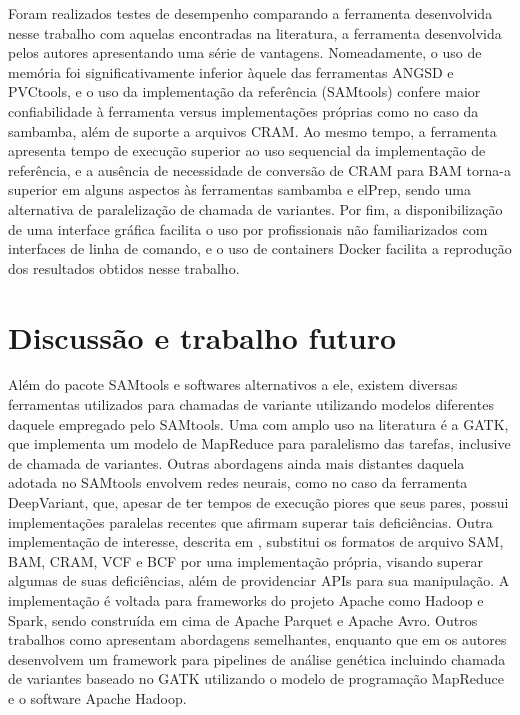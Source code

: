 \documentclass[cic,tc]{iiufrgs}
\begin{document}
Foram realizados testes de desempenho comparando a ferramenta desenvolvida
nesse trabalho com aquelas encontradas na literatura, a ferramenta desenvolvida
pelos autores apresentando uma série de vantagens. Nomeadamente, o uso de
memória foi significativamente inferior àquele das ferramentas ANGSD e
PVCtools, e o uso da implementação da referência (SAMtools) confere maior
confiabilidade à ferramenta versus implementações próprias como no caso da
sambamba, além de suporte a arquivos CRAM. Ao mesmo tempo, a ferramenta
apresenta tempo de execução superior ao uso sequencial da implementação de
referência, e a ausência de necessidade de conversão de CRAM para BAM torna-a
superior em alguns aspectos às ferramentas sambamba e elPrep, sendo uma
alternativa de paralelização de chamada de variantes. Por fim, a
disponibilização de uma interface gráfica facilita o uso por profissionais não
familiarizados com interfaces de linha de comando, e o uso de containers Docker
facilita a reprodução dos resultados obtidos nesse trabalho.

\section{Discussão e trabalho futuro}

Além do pacote SAMtools e softwares alternativos a ele, existem diversas
ferramentas utilizados para chamadas de variante utilizando modelos diferentes
daquele empregado pelo SAMtools. Uma com amplo uso na
literatura\cite{de2017gatk} é a GATK\cite{mckenna2010genome}, que implementa um
modelo de MapReduce para paralelismo das tarefas, inclusive de chamada de
variantes. Outras abordagens ainda mais distantes daquela adotada no SAMtools
envolvem redes neurais, como no caso da ferramenta
DeepVariant,\cite{poplin2018universal} que, apesar de ter tempos de execução
piores que seus pares, possui implementações paralelas recentes que afirmam
superar tais deficiências.\cite{ahmad2021vc} Outra implementação de interesse,
descrita em \cite{massie2013adam}, substitui os formatos de arquivo SAM, BAM,
CRAM, VCF e BCF por uma implementação própria, visando superar algumas de suas
deficiências, além de providenciar APIs para sua manipulação. A implementação é
voltada para frameworks do projeto Apache como Hadoop e Spark, sendo construída
em cima de Apache Parquet e Apache Avro.  Outros trabalhos como
\cite{boufea2017managing} apresentam abordagens semelhantes, enquanto que em
\cite{decap2015halvade} os autores desenvolvem um framework para pipelines de
análise genética incluindo chamada de variantes baseado no GATK utilizando o
modelo de programação MapReduce e o software Apache Hadoop.
\end{document}
